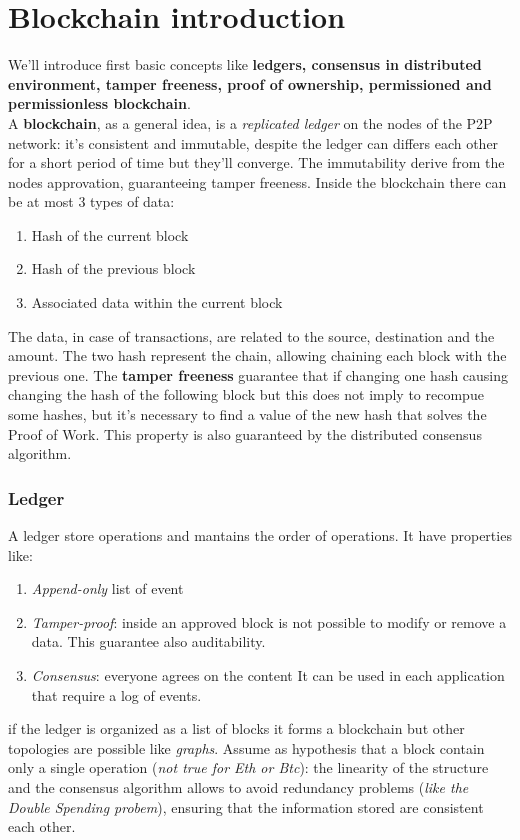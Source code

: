 \documentclass[10pt,a4paper]{report}
\begin{document}
\section{Blockchain introduction}\label{sec:blockchain-introduction}
We'll introduce first basic concepts like \textbf{ledgers, consensus in distributed environment, tamper freeness, proof of ownership, permissioned and permissionless blockchain}.\\
A \textbf{blockchain}, as a general idea, is a \textit{replicated ledger} on the nodes of the P2P network: it's consistent and immutable, despite the ledger can differs each other for a short period of time but they'll converge. The immutability derive from the nodes approvation, guaranteeing tamper freeness.
Inside the blockchain there can be at most 3 types of data:
\begin{enumerate}
	\item 
	Hash of the current block
	\item 
	Hash of the previous block
	\item 
	Associated data within the current block
	
\end{enumerate}
The data, in case of transactions, are related to the source, destination and the amount. The two hash represent the chain, allowing chaining each block with the previous one.
The \textbf{tamper freeness} guarantee that if changing one hash causing changing the hash of the following block but this does not imply to recompue some hashes, but it's necessary to find a value of the new hash that solves the Proof of Work. This property is also guaranteed by the distributed consensus algorithm.
\subsubsection{Ledger}\label{sec:ledger}
A ledger store operations and mantains the order of operations. It have properties like:
\begin{enumerate}
	\item 
	\textit{Append-only} list of event
	\item 
	\textit{Tamper-proof}: inside an approved block is not possible to modify or remove a data. This guarantee also auditability.
	\item 
	\textit{Consensus}: everyone agrees on the content
	It can be used in each application that require a log of events.
\end{enumerate}

if the ledger is organized as a list of blocks it forms a blockchain but other topologies are possible like \textit{graphs}. Assume as hypothesis that a block contain only a single operation (\textit{not true for Eth or Btc}): the linearity of the structure and the consensus algorithm allows to avoid redundancy problems (\textit{like the Double Spending probem}), ensuring that the  information stored are consistent each other.
\end{document}
